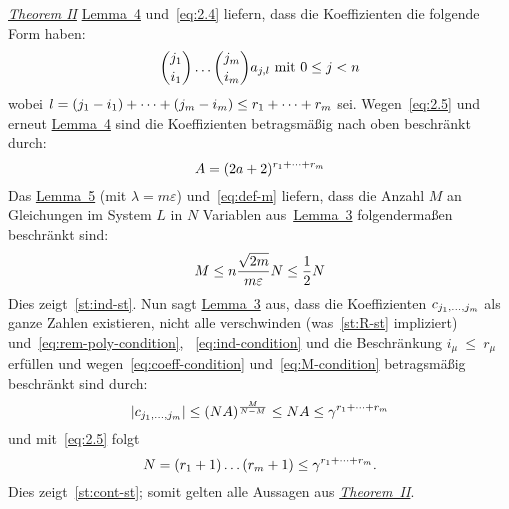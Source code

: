 \begin{namedproof}{\emph{\hyperref[subsec:th2]{Theorem II}}}
            \hyperref[subsec:lemma4]{Lemma~4} und~\eqref{eq:2.4} liefern, dass die Koeffizienten die folgende Form haben:
            \begin{equation*}
                \binom{j_1}{i_1} \dots \binom{j_m}{i_m}a_{j,l} \ \textrm{mit}\  0 \leq j < n
            \end{equation*}
            wobei $l = (j_1 - i_1) + \dots + (j_m - i_m) \leq r_1 + \dots + r_m$ sei.
            \textrm{Wegen~\eqref{eq:2.5} und erneut \hyperref[subsec:lemma4]{Lemma~4} sind die Koeffizienten betragsmäßig
            nach oben beschränkt durch:}
            \begin{equation}
                A = (2a + 2)^{r_1 + \dots + r_m} \label{eq:coeff-condition}
            \end{equation}
            \textrm{Das \hyperref[subsec:lemma5]{Lemma~5} (mit $\lambda = m \varepsilon$) und~\eqref{eq:def-m} liefern,
            dass die Anzahl $M$ an Gleichungen im System $L$ in $N$ Variablen aus~\hyperref[subsec:lemma3]{Lemma~3}
            folgendermaßen beschränkt sind:}
            \begin{equation}
                M \leq n \frac{\sqrt{2m}}{m \varepsilon} N \leq \frac{1}{2} N \label{eq:M-condition}
            \end{equation}
            Dies zeigt~\ref{st:ind-st}.
            \newline
            \textrm{Nun sagt \hyperref[subsec:lemma3]{Lemma~3} aus, dass die Koeffizienten $c_{j_1, \dots, j_m}$ als ganze
            Zahlen existieren, nicht alle verschwinden (was~\ref{st:R-st} impliziert) und~\eqref{eq:rem-poly-condition},
            ~\eqref{eq:ind-condition} und die Beschränkung $i_\mu~\leq~r_\mu$ erfüllen und wegen~\eqref{eq:coeff-condition}
            und~\eqref{eq:M-condition} betragsmäßig beschränkt sind durch:}
            \begin{equation*}
                \left| c_{j_1, \dots, j_m} \right| \leq (NA)^{\frac{M}{N-M}} \leq NA \leq \gamma^{r_1 + \dots + r_m}
            \end{equation*}
            und mit~\eqref{eq:2.5} folgt
            \begin{equation*}
                N = (r_1 + 1) \dots (r_m + 1) \leq \gamma^{r_1 + \dots + r_m}.
            \end{equation*}
            Dies zeigt~\ref{st:cont-st}; somit gelten alle Aussagen aus \hyperref[subsec:th2]{\emph{Theorem~II}}.
        \end{namedproof}
    
